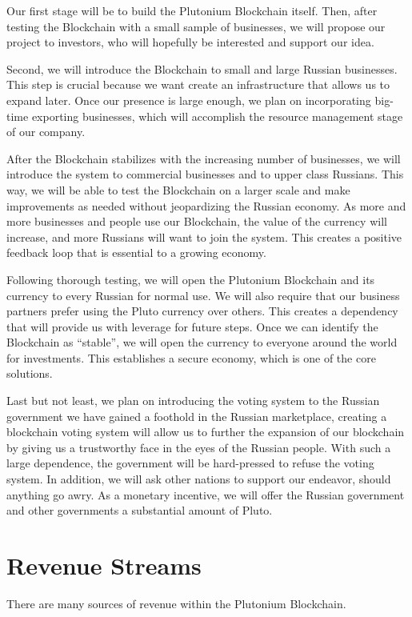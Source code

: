 \documentclass[12pt]{article}
\begin{document}
Our first stage will be to build the Plutonium Blockchain itself. Then, after testing the Blockchain with a small sample of businesses, we will propose our project to investors, who will hopefully be interested and support our idea.

Second, we will introduce the Blockchain to small and large Russian businesses. This step is crucial because we want create an infrastructure that allows us to expand later. Once our presence is large enough, we plan on incorporating big-time exporting businesses, which will accomplish the resource management stage of our company.

After the Blockchain stabilizes with the increasing number of businesses, we will introduce the system to commercial businesses and to upper class Russians. This way, we will be able to test the Blockchain on a larger scale and make improvements as needed without jeopardizing the Russian economy. As more and more businesses and people use our Blockchain, the value of the currency will increase, and more Russians will want to join the system. This creates a positive feedback loop that is essential to a growing economy. 

Following thorough testing, we will open the Plutonium Blockchain and its currency to every Russian for normal use. We will also require that our business partners prefer using the Pluto currency over others. This creates a dependency that will provide us with leverage for future steps. Once we can identify the Blockchain as ``stable'', we will open the currency to everyone around the world for investments. This establishes a secure economy, which is one of the core solutions.

Last but not least, we plan on introducing the voting system to the Russian government we have gained a foothold in the Russian marketplace, creating a blockchain voting system will allow us to further the expansion of our blockchain by giving us a trustworthy face in the eyes of the Russian people. With such a large dependence, the government will be hard-pressed to refuse the voting system. In addition, we will ask other nations to support our endeavor, should anything go awry. As a monetary incentive, we will offer the Russian government and other governments a substantial amount of Pluto.
\pagebreak
\section{Revenue Streams}
There are many sources of revenue within the Plutonium Blockchain.
\end{document}
